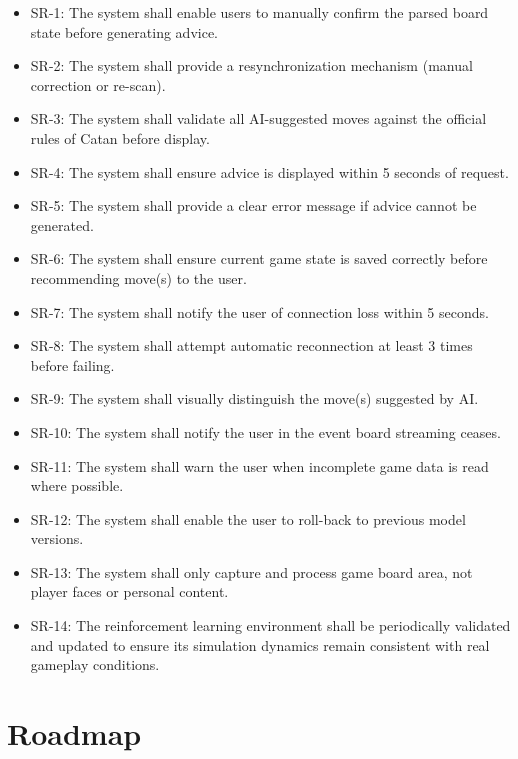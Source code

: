 \documentclass{article}
\begin{document}
\begin{itemize}
    \item SR-1: The system shall enable users to manually confirm the parsed board state before generating advice.
    \item SR-2: The system shall provide a resynchronization mechanism (manual correction or re-scan).
    \item SR-3: The system shall validate all AI-suggested moves against the official rules of Catan before display.
    \item SR-4: The system shall ensure advice is displayed within 5 seconds of request.
    \item SR-5: The system shall provide a clear error message if advice cannot be generated.
    \item SR-6: The system shall ensure current game state is saved correctly before recommending move(s) to the user.
    \item SR-7: The system shall notify the user of connection loss within 5 seconds.
    \item SR-8: The system shall attempt automatic reconnection at least 3 times before failing.
    \item SR-9: The system shall visually distinguish the move(s) suggested by AI.
    \item SR-10: The system shall notify the user in the event board streaming ceases.
    \item SR-11: The system shall warn the user when incomplete game data is read where possible.
    \item SR-12: The system shall enable the user to roll-back to previous model versions.
    \item SR-13: The system shall only capture and process game board area, not player faces or personal content.
    \item SR-14: The reinforcement learning environment shall be periodically 
    validated and updated to ensure its simulation dynamics remain consistent with real gameplay conditions.

\end{itemize}


\section{Roadmap}\label{sec:roadmap}
\end{document}
